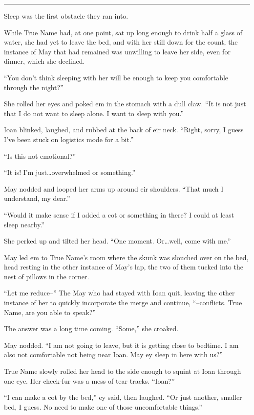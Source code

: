 \begin{center}\rule{0.5\linewidth}{0.5pt}\end{center}

Sleep was the first obstacle they ran into.

While True Name had, at one point, sat up long enough to drink half a glass of water, she had yet to leave the bed, and with her still down for the count, the instance of May that had remained was unwilling to leave her side, even for dinner, which she declined.

``You don't think sleeping with her will be enough to keep you comfortable through the night?''

She rolled her eyes and poked em in the stomach with a dull claw. ``It is not just that I do not want to sleep alone. I want to sleep with you.''

Ioan blinked, laughed, and rubbed at the back of eir neck. ``Right, sorry, I guess I've been stuck on logistics mode for a bit.''

``Is this not emotional?''

``It is! I'm just\ldots overwhelmed or something.''

May nodded and looped her arms up around eir shoulders. ``That much I understand, my dear.''

``Would it make sense if I added a cot or something in there? I could at least sleep nearby.''

She perked up and tilted her head. ``One moment. Or\ldots well, come with me.''

May led em to True Name's room where the skunk was slouched over on the bed, head resting in the other instance of May's lap, the two of them tucked into the nest of pillows in the corner.

``Let me reduce--'' The May who had stayed with Ioan quit, leaving the other instance of her to quickly incorporate the merge and continue, ``--conflicts. True Name, are you able to speak?''

The answer was a long time coming. ``Some,'' she croaked.

May nodded. ``I am not going to leave, but it is getting close to bedtime. I am also not comfortable not being near Ioan. May ey sleep in here with us?''

True Name slowly rolled her head to the side enough to squint at Ioan through one eye. Her cheek-fur was a mess of tear tracks. ``Ioan?''

``I can make a cot by the bed,'' ey said, then laughed. ``Or just another, smaller bed, I guess. No need to make one of those uncomfortable things.''

